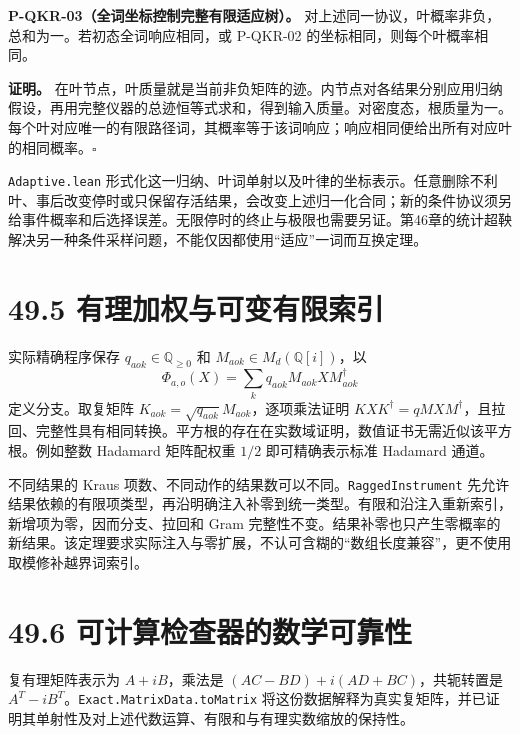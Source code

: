 \documentclass[
  11pt,
  oneside]{book}
\begin{document}
\textbf{P-QKR-03（全词坐标控制完整有限适应树）。}
对上述同一协议，叶概率非负，总和为一。若初态全词响应相同，或 P-QKR-02
的坐标相同，则每个叶概率相同。

\textbf{证明。}
在叶节点，叶质量就是当前非负矩阵的迹。内节点对各结果分别应用归纳假设，再用完整仪器的总迹恒等式求和，得到输入质量。对密度态，根质量为一。每个叶对应唯一的有限路径词，其概率等于该词响应；响应相同便给出所有对应叶的相同概率。\(\square\)

\texttt{Adaptive.lean}
形式化这一归纳、叶词单射以及叶律的坐标表示。任意删除不利叶、事后改变停时或只保留存活结果，会改变上述归一化合同；新的条件协议须另给事件概率和后选择误差。无限停时的终止与极限也需要另证。第46章的统计超鞅解决另一种条件采样问题，不能仅因都使用``适应''一词而互换定理。

\hypertarget{ux6709ux7406ux52a0ux6743ux4e0eux53efux53d8ux6709ux9650ux7d22ux5f15}{%
\section{49.5
有理加权与可变有限索引}\label{ux6709ux7406ux52a0ux6743ux4e0eux53efux53d8ux6709ux9650ux7d22ux5f15}}

实际精确程序保存 \(q_{aok}\in\mathbb Q_{\ge0}\) 和
\(M_{aok}\in M_d(\mathbb Q[i])\)，以 \[
\Phi_{a,o}(X)=\sum_kq_{aok}M_{aok}XM_{aok}^{\dagger}
\] 定义分支。取复矩阵 \(K_{aok}=\sqrt{q_{aok}}M_{aok}\)，逐项乘法证明
\(KXK^\dagger=qMXM^\dagger\)，且拉回、完整性具有相同转换。平方根的存在在实数域证明，数值证书无需近似该平方根。例如整数
Hadamard 矩阵配权重 \(1/2\) 即可精确表示标准 Hadamard 通道。

不同结果的 Kraus
项数、不同动作的结果数可以不同。\texttt{RaggedInstrument}
先允许结果依赖的有限项类型，再沿明确注入补零到统一类型。有限和沿注入重新索引，新增项为零，因而分支、拉回和
Gram
完整性不变。结果补零也只产生零概率的新结果。该定理要求实际注入与零扩展，不认可含糊的``数组长度兼容''，更不使用取模修补越界词索引。

\hypertarget{ux53efux8ba1ux7b97ux68c0ux67e5ux5668ux7684ux6570ux5b66ux53efux9760ux6027}{%
\section{49.6
可计算检查器的数学可靠性}\label{ux53efux8ba1ux7b97ux68c0ux67e5ux5668ux7684ux6570ux5b66ux53efux9760ux6027}}

复有理矩阵表示为 \(A+iB\)，乘法是 \((AC-BD)+i(AD+BC)\)，共轭转置是
\(A^T-iB^T\)。\texttt{Exact.MatrixData.toMatrix}
将这份数据解释为真实复矩阵，并已证明其单射性及对上述代数运算、有限和与有理实数缩放的保持性。
\end{document}
